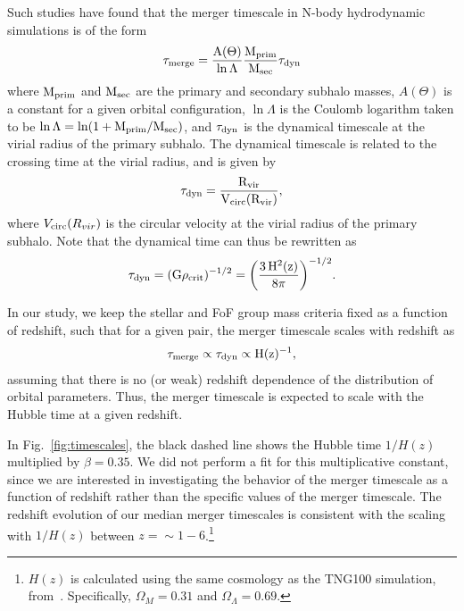 \documentclass[twocolumn,linenumbers]{aastex631}
\begin{document}
        Such studies have found that the merger timescale in N-body hydrodynamic simulations is of the form
        \begin{equation}
            \rm \tau_{\rm merge} = \frac{A(\Theta)}{\ln \Lambda}\frac{\mprim}{\msec}\tau_{\rm dyn}
        \end{equation}
        where $\rm M_{prim}$ and $\rm M_{sec}$ are the primary and secondary subhalo masses, $A(\Theta)$ is a constant for a given orbital configuration, $\ln\Lambda$ is the Coulomb logarithm taken to be $\ln\Lambda = \ln(1+\rm M_{prim}/\rm M_{sec})$, and $\tau_{\rm dyn}$ is the dynamical timescale at the virial radius of the primary subhalo.
        The dynamical timescale is related to the crossing time at the virial radius, and is given by 
        \begin{equation}
            \rm \tau_{\rm dyn} = \frac{\Rvir}{V_{\rm circ}(\Rvir)},
        \end{equation}
        where $V_{\rm circ}(R_{vir})$ is the circular velocity at the virial radius of the primary subhalo. 
        Note that the dynamical time can thus be rewritten as 
        \begin{equation}
            \rm \tau_{\rm dyn} = (G\rho_{crit})^{-1/2} = \bigg(\frac{3\,H^2(z)}{8\pi}\bigg)^{-1/2}.
        \end{equation}

        In our study, we keep the stellar and FoF group mass criteria fixed as a function of redshift, such that for a given pair, the merger timescale scales with redshift as
        \begin{equation}
            \rm \tau_{merge} \propto \tau_{dyn} \propto H(z)^{-1},
        \end{equation}
        assuming that there is no (or weak) redshift dependence of the distribution of orbital parameters.
        Thus, the merger timescale is expected to scale with the Hubble time at a given redshift. 
        
        In Fig.~\ref{fig:timescales}, the black dashed line shows the Hubble time $1/H(z)$ multiplied by $\beta=0.35$. 
        We did not perform a fit for this multiplicative constant, since we are interested in investigating the behavior of the merger timescale as a function of redshift rather than the specific values of the merger timescale. 
        The redshift evolution of our median merger timescales is consistent with the scaling with $1/H(z)$ between $z=\sim1-6$.\footnote{$H(z)$ is calculated using the same cosmology as the TNG100 simulation, from~\citet{Planck2018}. Specifically, $\Omega_M=0.31$ and $\Omega_{\Lambda}=0.69$.}
        
\end{document}
